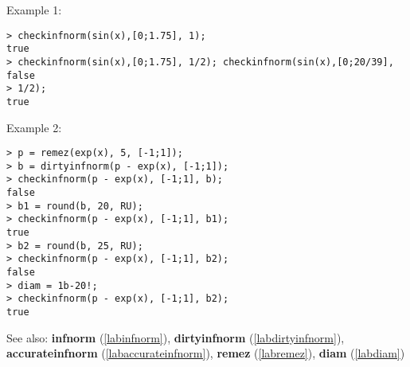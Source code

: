 \noindent Example 1: 
\begin{center}\begin{minipage}{15cm}\begin{Verbatim}[frame=single]
> checkinfnorm(sin(x),[0;1.75], 1);
true
> checkinfnorm(sin(x),[0;1.75], 1/2); checkinfnorm(sin(x),[0;20/39],
false
> 1/2);
true
\end{Verbatim}
\end{minipage}\end{center}
\noindent Example 2: 
\begin{center}\begin{minipage}{15cm}\begin{Verbatim}[frame=single]
> p = remez(exp(x), 5, [-1;1]);
> b = dirtyinfnorm(p - exp(x), [-1;1]);
> checkinfnorm(p - exp(x), [-1;1], b);
false
> b1 = round(b, 20, RU);
> checkinfnorm(p - exp(x), [-1;1], b1);
true
> b2 = round(b, 25, RU);
> checkinfnorm(p - exp(x), [-1;1], b2);
false
> diam = 1b-20!;
> checkinfnorm(p - exp(x), [-1;1], b2);
true
\end{Verbatim}
\end{minipage}\end{center}
See also: \textbf{infnorm} (\ref{labinfnorm}), \textbf{dirtyinfnorm} (\ref{labdirtyinfnorm}), \textbf{accurateinfnorm} (\ref{labaccurateinfnorm}), \textbf{remez} (\ref{labremez}), \textbf{diam} (\ref{labdiam})
